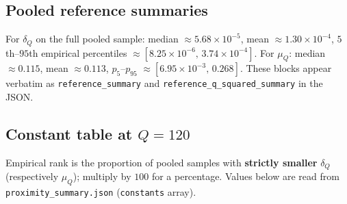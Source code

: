 \documentclass[
]{article}
\begin{document}
\subsection{Pooled reference
summaries}\label{pooled-reference-summaries}

For \(\delta_Q\) on the full pooled sample: median
\(\approx 5.68\times 10^{-5}\), mean \(\approx 1.30\times 10^{-4}\),
\(5\)th--\(95\)th empirical percentiles
\(\approx [8.25\times 10^{-6},\,3.74\times 10^{-4}]\). For \(\mu_Q\):
median \(\approx 0.115\), mean \(\approx 0.113\), \(p_5\)--\(p_{95}\)
\(\approx [6.95\times 10^{-3},\,0.268]\). These blocks appear verbatim
as \texttt{reference\_summary} and
\texttt{reference\_q\_squared\_summary} in the JSON.

\subsection{\texorpdfstring{Constant table at
\(Q=120\)}{Constant table at Q=120}}\label{constant-table-at-q120}

Empirical rank is the proportion of pooled samples with \textbf{strictly
smaller} \(\delta_Q\) (respectively \(\mu_Q\)); multiply by \(100\) for
a percentage. Values below are read from
\texttt{proximity\_summary.json} (\texttt{constants} array).
\end{document}
